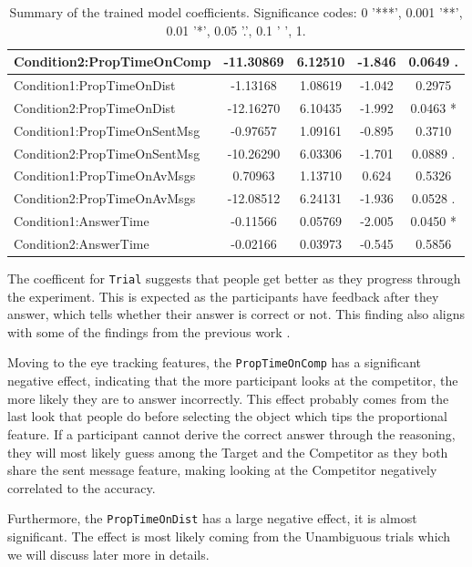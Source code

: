 \begin{table}[h!]
\begin{tabular}{|l|c|c|c|c|}
Condition2:PropTimeOnComp          & -11.30869 & 6.12510 & -1.846 & 0.0649 . \\ \hline
Condition1:PropTimeOnDist           & -1.13168 & 1.08619 & -1.042 & 0.2975 \\ \hline
Condition2:PropTimeOnDist          & -12.16270 & 6.10435 & -1.992 & 0.0463 * \\ \hline
Condition1:PropTimeOnSentMsg        & -0.97657 & 1.09161 & -0.895 & 0.3710 \\ \hline
Condition2:PropTimeOnSentMsg       & -10.26290 & 6.03306 & -1.701 & 0.0889 . \\ \hline
Condition1:PropTimeOnAvMsgs   & 0.70963 & 1.13710 & 0.624 & 0.5326 \\ \hline
Condition2:PropTimeOnAvMsgs & -12.08512 & 6.24131 & -1.936 & 0.0528 . \\ \hline
Condition1:AnswerTime               & -0.11566 & 0.05769 & -2.005 & 0.0450 * \\ \hline
Condition2:AnswerTime               & -0.02166 & 0.03973 & -0.545 & 0.5856 \\ \hline
\end{tabular}
\caption{Summary of the trained model coefficients. Significance codes: 0 '***', 0.001 '**', 0.01 '*', 0.05 '.', 0.1 ' ', 1.}
\label{tab:model_coefficients_acc}
\end{table}

The coefficent for \texttt{Trial} suggests that people get better as they progress through the experiment. This is expected as the participants have feedback after they answer, which tells whether their answer is correct or not. This finding also aligns with some of the findings from the previous work \cite{Mayn_2023, Mayn_2025}. 

Moving to the eye tracking features, the \texttt{PropTimeOnComp} has a significant negative effect, indicating that the more participant looks at the competitor, the more likely they are to answer incorrectly. This effect probably comes from the last look that people do before selecting the object which tips the proportional feature. If a participant cannot derive the correct answer through the reasoning, they will most likely guess among the Target and the Competitor as they both share the sent message feature, making looking at the Competitor negatively correlated to the accuracy.

Furthermore, the \texttt{PropTimeOnDist} has a large negative effect, it is almost significant. The effect is most likely coming from the Unambiguous trials which we will discuss later more in details. 

